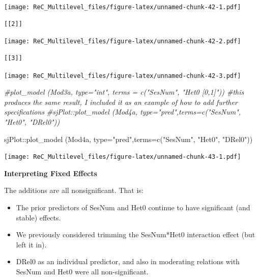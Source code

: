 \documentclass[
  english,
]{book}
\newenvironment{Shaded}{\begin{snugshade}}{\end{snugshade}}
\newcommand{\AttributeTok}[1]{\textcolor[rgb]{0.77,0.63,0.00}{#1}}
\newcommand{\CommentTok}[1]{\textcolor[rgb]{0.56,0.35,0.01}{\textit{#1}}}
\newcommand{\FunctionTok}[1]{\textcolor[rgb]{0.00,0.00,0.00}{#1}}
\newcommand{\NormalTok}[1]{#1}
\newcommand{\SpecialCharTok}[1]{\textcolor[rgb]{0.00,0.00,0.00}{#1}}
\newcommand{\StringTok}[1]{\textcolor[rgb]{0.31,0.60,0.02}{#1}}
\providecommand{\tightlist}{%
  \setlength{\itemsep}{0pt}\setlength{\parskip}{0pt}}
\begin{document}
\texttt{[image: ReC\_Multilevel\_files/figure-latex/unnamed-chunk-42-1.pdf]}

\begin{verbatim}
[[2]]
\end{verbatim}

\texttt{[image: ReC\_Multilevel\_files/figure-latex/unnamed-chunk-42-2.pdf]}

\begin{verbatim}
[[3]]
\end{verbatim}

\texttt{[image: ReC\_Multilevel\_files/figure-latex/unnamed-chunk-42-3.pdf]}

\begin{Shaded}
\begin{Highlighting}[]
\CommentTok{\#plot\_model (Mod3a, type="int", terms = c("SesNum", "Het0 [0,1]")) \#this produces the same result, I included it as an example of how to add further specifications}
\CommentTok{\#sjPlot::plot\_model (Mod4a, type="pred",terms=c("SesNum", "Het0", "DRel0"))}
\end{Highlighting}
\end{Shaded}

\begin{Shaded}
\begin{Highlighting}[]
\NormalTok{sjPlot}\SpecialCharTok{::}\FunctionTok{plot\_model}\NormalTok{ (Mod4a, }\AttributeTok{type=}\StringTok{"pred"}\NormalTok{,}\AttributeTok{terms=}\FunctionTok{c}\NormalTok{(}\StringTok{"SesNum"}\NormalTok{, }\StringTok{"Het0"}\NormalTok{, }\StringTok{"DRel0"}\NormalTok{))}
\end{Highlighting}
\end{Shaded}

\texttt{[image: ReC\_Multilevel\_files/figure-latex/unnamed-chunk-43-1.pdf]}

\textbf{Interpreting Fixed Effects}

The additions are all nonsignificant. That is:

\begin{itemize}
\tightlist
\item
  The prior predictors of SesNum and Het0 continue to have significant (and stable) effects.
\item
  We previously considered trimming the SesNum*Het0 interaction effect (but left it in).
\item
  DRel0 as an individual predictor, and also in moderating relations with SesNum and Het0 were all non-significant.
\end{itemize}
\end{document}
